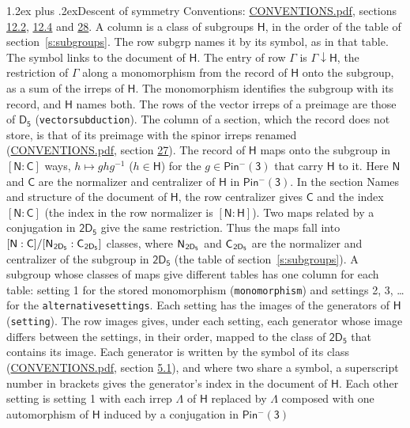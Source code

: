 \documentclass[10pt,a4paper]{article}
\makeatletter
\renewcommand\section{\@startsection{section}{1}{\z@}{-3ex plus -1ex minus -.2ex}%
  {1.2ex plus .2ex}{\normalfont\large\sffamily\bfseries\color{parttitle}}}
\numberwithin{equation}{section}
\newcommand{\grp}[1]{\mathsf{#1}}
\newcommand{\grpindex}[2]{[#1 : #2]}
\newcommand{\restr}[2]{#1\!\downarrow#2}
\newcommand{\hairsp}{\mkern1mu}
\makeatother
\begin{document}
\section{Descent of symmetry}\label{s:subduction}
Conventions: \href{../../CONVENTIONS.pdf}{CONVENTIONS.pdf}, sections \href{../../../rotation/CONVENTIONS.pdf\#conv.12.2}{12.2}, \href{../../../rotation/CONVENTIONS.pdf\#conv.12.4}{12.4} and \href{../../CONVENTIONS.pdf\#conv.28}{28}.
A column is a class of subgroups $\grp{H}$, in the order of the table of section~\ref{s:subgroups}. The row subgrp names it by its symbol, as in that table. The symbol links to the document of $\grp{H}$. The entry of row $\Gamma$ is $\restr{\Gamma}{\grp{H}}$, the restriction of $\Gamma$ along a monomorphism from the record of $\grp{H}$ onto the subgroup, as a sum of the irreps of $\grp{H}$. The monomorphism identifies the subgroup with its record, and $\grp{H}$ names both. The rows of the vector irreps of a preimage are those of \href{../../../rotation/data/pdf/D5.pdf}{$\grp{D_{5}}$} (\texttt{vectorsubduction}). The column of a section, which the record does not store, is that of its preimage with the spinor irreps renamed (\href{../../CONVENTIONS.pdf}{CONVENTIONS.pdf}, section \href{../../CONVENTIONS.pdf\#conv.27}{27}). \label{n:group.normalizer.o3}\label{n:group.centralizer.o3}\label{n:element.h}The record of $\grp{H}$ maps onto the subgroup in $\grpindex{\grp{N}}{\grp{C}}$ ways, $h \mapsto g h g^{-1}$ ($h \in \grp{H}$) for the $g \in \grp{Pin^{-}(3)}$ that carry $\grp{H}$ to it. Here $\grp{N}$ and $\grp{C}$ are the normalizer and centralizer of $\grp{H}$ in \href{Pinminus3.pdf}{$\grp{Pin^{-}(3)}$}. In the section Names and structure of the document of $\grp{H}$, the row centralizer gives $\grp{C}$ and the index $\grpindex{\grp{N}}{\grp{C}}$ (the index in the row normalizer is $\grpindex{\grp{N}}{\grp{H}}$). Two maps related by a conjugation in $\grp{2D_{5}}$ give the same restriction. Thus the maps fall into $\grpindex{\grp{N}}{\grp{C}}/\grpindex{\grp{N}_{\hairsp \grp{2D_{5}}}}{\grp{C}_{\hairsp \grp{2D_{5}}}}$ classes, where $\grp{N}_{\hairsp \grp{2D_{5}}}$ and $\grp{C}_{\hairsp \grp{2D_{5}}}$ are the normalizer and centralizer of the subgroup in $\grp{2D_{5}}$ (the table of section~\ref{s:subgroups}). \label{n:head.setting}A subgroup whose classes of maps give different tables has one column for each table: setting 1 for the stored monomorphism (\texttt{monomorphism}) and settings 2, 3, \dots{} for the \texttt{alternativesettings}. Each setting has the images of the generators of $\grp{H}$ (\texttt{setting}). \label{n:head.images}The row images gives, under each setting, each generator whose image differs between the settings, in their order, mapped to the class of $\grp{2D_{5}}$ that contains its image. Each generator is written by the symbol of its class (\href{../../CONVENTIONS.pdf}{CONVENTIONS.pdf}, section \href{../../../rotation/CONVENTIONS.pdf\#conv.5.1}{5.1}), and where two share a symbol, a superscript number in brackets gives the generator's index in the document of $\grp{H}$. \label{n:irrep.Delta}Each other setting is setting 1 with each irrep $\Lambda$ of $\grp{H}$ replaced by $\Lambda$ composed with one automorphism of $\grp{H}$ induced by a conjugation in \href{Pinminus3.pdf}{$\grp{Pin^{-}(3)}$} 
\end{document}
